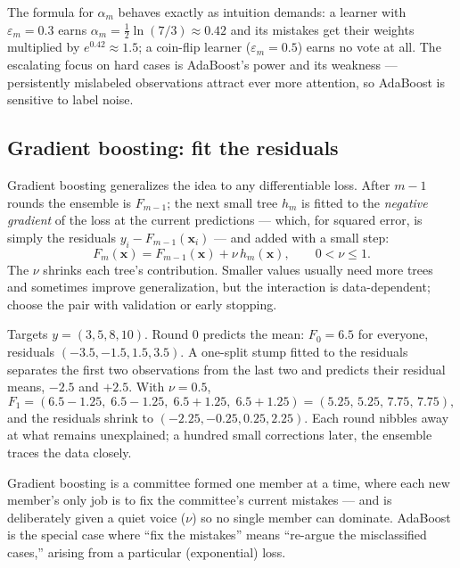 The formula for $\alpha_m$ behaves exactly as intuition demands: a learner with $\varepsilon_m=0.3$ earns $\alpha_m=\tfrac{1}{2}\ln(7/3)\approx 0.42$ and its mistakes get their weights multiplied by $e^{0.42}\approx 1.5$; a coin-flip learner ($\varepsilon_m=0.5$) earns no vote at all. The escalating focus on hard cases is AdaBoost's power and its weakness --- persistently mislabeled observations attract ever more attention, so AdaBoost is sensitive to label noise.

\subsection{Gradient boosting: fit the residuals}
\label{sec:gradient-boosting}

Gradient boosting generalizes the idea to any differentiable loss. After $m-1$ rounds the ensemble is $F_{m-1}$; the next small tree $h_m$ is fitted to the \emph{negative gradient} of the loss at the current predictions --- which, for squared error, is simply the residuals $y_i-F_{m-1}(\bm{x}_i)$ --- and added with a small step:
\[
  F_m(\bm{x})
  =F_{m-1}(\bm{x})+\nu\,h_m(\bm{x}),
  \qquad 0<\nu\leq 1.
\]
The  $\nu$ shrinks each tree's contribution. Smaller values usually need more trees and sometimes improve generalization, but the interaction is data-dependent; choose the pair with validation or early stopping.

\begin{workedexample}
Targets $y=(3,5,8,10)$. Round 0 predicts the mean: $F_0=6.5$ for everyone, residuals $(-3.5,-1.5,1.5,3.5)$. A one-split stump fitted to the residuals separates the first two observations from the last two and predicts their residual means, $-2.5$ and $+2.5$. With $\nu=0.5$,
\[
  F_1=(6.5-1.25,\;6.5-1.25,\;6.5+1.25,\;6.5+1.25)
  =(5.25,\,5.25,\,7.75,\,7.75),
\]
and the residuals shrink to $(-2.25,-0.25,0.25,2.25)$. Each round nibbles away at what remains unexplained; a hundred small corrections later, the ensemble traces the data closely.
\end{workedexample}

\begin{intuition}
Gradient boosting is a committee formed one member at a time, where each new member's only job is to fix the committee's current mistakes --- and is deliberately given a quiet voice ($\nu$) so no single member can dominate. AdaBoost is the special case where ``fix the mistakes'' means ``re-argue the misclassified cases,'' arising from a particular (exponential) loss.
\end{intuition}

